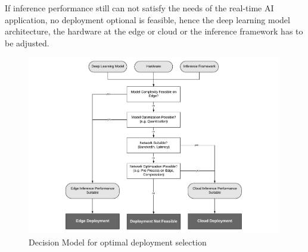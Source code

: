 If inference performance still can not satisfy the needs of the real-time AI application, no deployment optional is feasible, hence the deep learning model architecture, the hardware at the edge or cloud or the inference framework has to be adjusted.
\begin{figure}[H]
\centering
\includegraphics[width=0.99\textwidth]{./Bilder/DecisionModel.pdf}
\caption{Decision Model for optimal deployment selection}
\label{fig:DecisionModel}
\end{figure}

